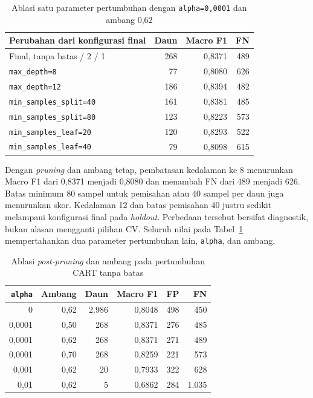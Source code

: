 \begin{table}[H]
    \centering
    \caption{Ablasi satu parameter pertumbuhan dengan \texttt{alpha=0,0001} dan ambang 0,62}
    \label{tab-dtl-onefactor}
    \begin{tabular}{lrrr}
        \hline
        Perubahan dari konfigurasi final & Daun & Macro F1 & FN  \\
        \hline
        Final, tanpa batas / 2 / 1       & 268  & 0,8371   & 489 \\
        \texttt{max\_depth=8}            & 77   & 0,8080   & 626 \\
        \texttt{max\_depth=12}           & 186  & 0,8394   & 482 \\
        \texttt{min\_samples\_split=40}  & 161  & 0,8381   & 485 \\
        \texttt{min\_samples\_split=80}  & 123  & 0,8223   & 573 \\
        \texttt{min\_samples\_leaf=20}   & 120  & 0,8293   & 522 \\
        \texttt{min\_samples\_leaf=40}   & 79   & 0,8098   & 615 \\
        \hline
    \end{tabular}
\end{table}

Dengan \textit{pruning} dan ambang tetap, pembatasan kedalaman ke 8 menurunkan Macro F1 dari 0,8371 menjadi 0,8080 dan menambah FN dari 489 menjadi 626. Batas minimum 80 sampel untuk pemisahan atau 40 sampel per daun juga menurunkan skor. Kedalaman 12 dan batas pemisahan 40 justru sedikit melampaui konfigurasi final pada \textit{holdout}. Perbedaan tersebut bersifat diagnostik, bukan alasan mengganti pilihan CV. Seluruh nilai pada Tabel~\ref{tab-dtl-onefactor} mempertahankan dua parameter pertumbuhan lain, \texttt{alpha}, dan ambang.

\begin{table}[H]
    \centering
    \caption{Ablasi \textit{post-pruning} dan ambang pada pertumbuhan CART tanpa batas}
    \label{tab-dtl-pruning}
    \begin{tabular}{rrrrrr}
        \hline
        \texttt{alpha} & Ambang & Daun  & Macro F1 & FP  & FN    \\
        \hline
        0              & 0,62   & 2.986 & 0,8048   & 498 & 450   \\
        0,0001         & 0,50   & 268   & 0,8371   & 276 & 485   \\
        0,0001         & 0,62   & 268   & 0,8371   & 271 & 489   \\
        0,0001         & 0,70   & 268   & 0,8259   & 221 & 573   \\
        0,001          & 0,62   & 20    & 0,7933   & 322 & 628   \\
        0,01           & 0,62   & 5     & 0,6862   & 284 & 1.035 \\
        \hline
    \end{tabular}
\end{table}

